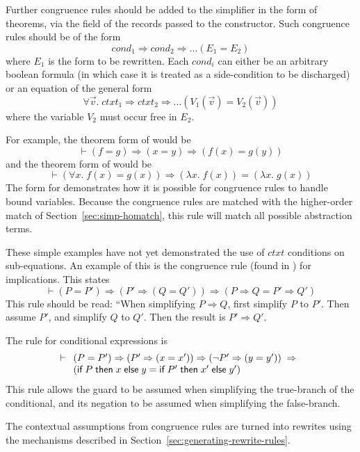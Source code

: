 Further congruence rules should be added to the simplifier in the form
of theorems, via the  field of the records passed to the
 constructor.  Such congruence rules should be of the form
\[
\mathit{cond_1} \Rightarrow \mathit{cond_2} \Rightarrow \dots (E_1 =
E_2)
\]
where $E_1$ is the form to be rewritten.  Each $\mathit{cond}_i$ can
either be an arbitrary boolean formula (in which case it is treated as
a side-condition to be discharged) or an equation of the general form
\[
\forall \vec{v}. \;\mathit{ctxt}_1 \Rightarrow \mathit{ctxt}_2
\Rightarrow \dots (V_1(\vec{v}) = V_2(\vec{v}))
\]
where the variable $V_2$ must occur free in $E_2$.

For example, the theorem form of  would be
\[
\vdash (f = g) \Rightarrow (x = y) \Rightarrow (f(x) = g(y))
\]
and the theorem form of  would be
\[
\vdash (\forall x. \;f (x) = g (x)) \Rightarrow (\lambda x. \;f(x)) = (\lambda
x.\;g(x))
\]
The form for  demonstrates how it is possible for congruence
rules to handle bound variables.  Because the congruence rules are
matched with the higher-order match of Section~\ref{sec:simp-homatch},
this rule will match all possible abstraction terms.

These simple examples have not yet demonstrated the use of
$\mathit{ctxt}$ conditions on sub-equations.  An example of this is
the congruence rule (found in ) for implications.  This
states
\[
\vdash (P = P') \Rightarrow (P' \Rightarrow (Q = Q')) \Rightarrow
(P \Rightarrow Q = P' \Rightarrow Q')
\]
This rule should be read: ``When simplifying $P\Rightarrow Q$, first
simplify $P$ to $P'$.  Then assume $P'$, and simplify $Q$ to $Q'$.
Then the result is $P' \Rightarrow Q'$.

The rule for conditional expressions is
\[
\vdash \begin{array}[t]{l}
  (P = P') \Rightarrow (P' \Rightarrow (x = x')) \Rightarrow
  (\neg P' \Rightarrow (y = y')) \;\Rightarrow\\
       (\textsf{if}\;P\;\textsf{then}\;x\;\textsf{else}\;y =
       \textsf{if}\;P'\;\textsf{then}\;x'\;\textsf{else}\;y')
\end{array}
\]
This rule allows the guard to be assumed when simplifying the
true-branch of the conditional, and its negation to be assumed when
simplifying the false-branch.

The contextual assumptions from congruence rules are turned into
rewrites using the mechanisms described in
Section~\ref{sec:generating-rewrite-rules}.

